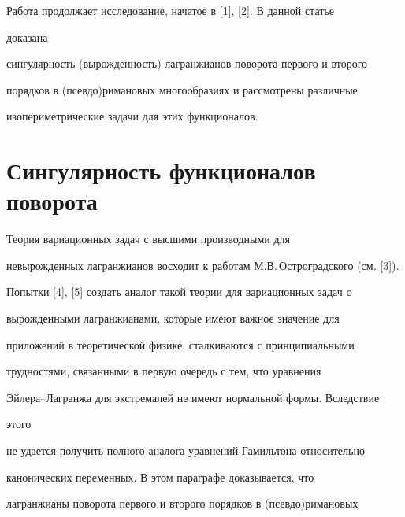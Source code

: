  




\maketitle 


\label{begin} 


 


 


 


Работа продолжает исследование, начатое в [1], [2]. В данной статье 


доказана 


сингулярность (вырожденность) лагранжианов поворота первого и второго 


порядков в (псевдо)римановых многообразиях и рассмотрены различные 


изопериметрические задачи для этих функционалов. 


 


\section{Сингулярность функционалов поворота} 


 


Теория вариационных задач с высшими производными для 


невырожденных лагранжианов восходит к работам М.В.\,Остроградского (см. [3]). 


Попытки [4], [5] создать аналог такой теории для вариационных задач с 


вырожденными лагранжианами, которые имеют важное значение для 


приложений в теоретической физике, сталкиваются с принципиальными 


трудностями, связанными в первую очередь с тем, что уравнения 


Эйлера--Лагранжа для экстремалей не имеют нормальной формы. Вследствие 


этого 


не удается получить полного аналога уравнений Гамильтона относительно 


канонических переменных. В этом параграфе доказывается, что 


лагранжианы поворота первого и второго порядков в (псевдо)римановых 


